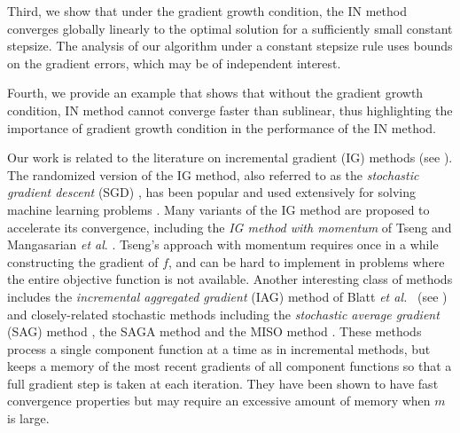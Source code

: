 \documentclass[final,numbook]{svjour3}
\begin{document}
Third, we show that under the gradient growth condition, the IN method converges globally linearly to the optimal solution for a sufficiently small constant stepsize. The analysis of our algorithm under a constant stepsize rule uses bounds on the gradient errors, which may be of independent interest. 

Fourth, we provide an example that shows that without the gradient growth condition, IN method cannot converge faster than sublinear, thus highlighting the importance of gradient growth condition in the performance of the IN method.

Our work is related to the literature on incremental gradient (IG) methods (see \cite{Solodov98IncrGrad,Bertsekas99nonlinear,bertsekas2011incremental,BersekasIncrGrad97}). The randomized version of the IG method, also referred to as the {\it stochastic gradient descent} (SGD) \cite{RobbinsMonro,Schraudolph2007stochastic,BottouLecun2005}, has been popular and used extensively for solving machine learning problems \cite{Borges2010BookChapter,BottouLecun2005,Zhang2004}. Many variants of the IG method are proposed to accelerate its convergence, including the \textit{IG method with momentum} of Tseng  \cite{TsengIncrGradient98} and Mangasarian \textit{et al}. \cite{ManSol98IncGradMomentum}. Tseng's approach with momentum \cite{TsengIncrGradient98} requires once in a while constructing the gradient of $f$, and can be hard to implement in problems where the entire objective function is not available. Another interesting class of methods includes the  \textit{incremental aggregated gradient} (IAG) method of Blatt {\it et al.} \ (see \cite{Blatt2007incremental,TsengYun2014incremental}) and closely-related stochastic methods including the \textit{stochastic average gradient} (SAG) method \cite{Leroux2012sgd}, the SAGA method \cite{BachSagaMethod14} and the MISO method \cite{MairalSurrogate2013}. These methods process a single component function at a time as in incremental methods, but keeps a memory of the most recent gradients of all component functions so that a full gradient step 
is taken at each iteration. They have been shown to have fast convergence properties but may require an excessive amount of memory when $m$ is large.
\end{document}
